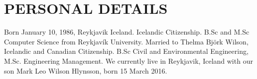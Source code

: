\section{PERSONAL DETAILS}
Born January 10, 1986, Reykjavik Iceland.  Icelandic Citizenship. B.Sc and M.Sc Computer Science from Reykjavík University.  Married to Thelma Björk Wilson, Icelandic and Canadian Citizenship. B.Sc Civil and Environmental Engineering, M.Sc. Engineering Management. We currently live in Reykjavik, Iceland with our son Mark Leo Wilson Hlynsson, born 15 March 2016.
